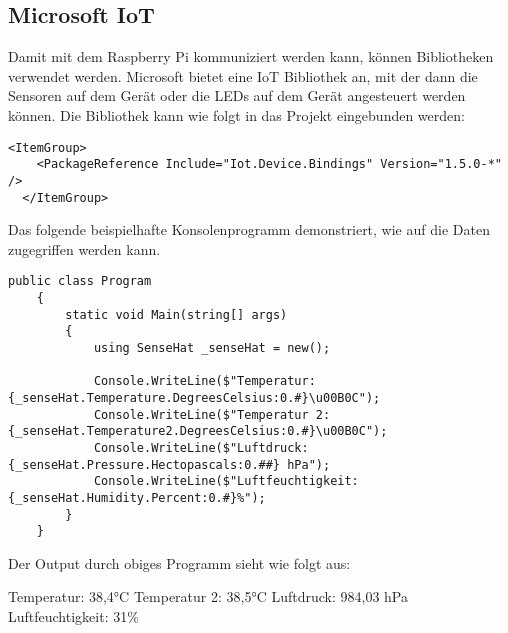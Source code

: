 \subsection{Microsoft IoT}
\label{subsec:MicrosoftIot}
Damit mit dem Raspberry Pi kommuniziert werden kann, können Bibliotheken verwendet werden.
Microsoft bietet eine IoT Bibliothek an, mit der dann die Sensoren auf dem Gerät oder die LEDs auf
dem Gerät angesteuert werden können. Die Bibliothek kann wie folgt in das Projekt eingebunden
werden:

\begin{lstlisting}[language={[Sharp]C}, caption=IoT NuGet Package,
    label=lst:IotNugetPackage]
    <ItemGroup>
    <PackageReference Include="Iot.Device.Bindings" Version="1.5.0-*" />
  </ItemGroup>
\end{lstlisting}

Das folgende beispielhafte Konsolenprogramm demonstriert, wie auf die Daten zugegriffen werden kann.

\begin{lstlisting}[language={[Sharp]C}, caption=SenseHat Beispielprogramm,
    label=lst:SenseHatBeispielProgramm]
    public class Program
    {
        static void Main(string[] args)
        {
            using SenseHat _senseHat = new();

            Console.WriteLine($"Temperatur: {_senseHat.Temperature.DegreesCelsius:0.#}\u00B0C");
            Console.WriteLine($"Temperatur 2: {_senseHat.Temperature2.DegreesCelsius:0.#}\u00B0C");
            Console.WriteLine($"Luftdruck: {_senseHat.Pressure.Hectopascals:0.##} hPa");
            Console.WriteLine($"Luftfeuchtigkeit: {_senseHat.Humidity.Percent:0.#}%");
        }
    }
\end{lstlisting}

Der Output durch obiges Programm sieht wie folgt aus:

\begin{zitat}
    Temperatur: 38,4°C
    \newline
    Temperatur 2: 38,5°C
    \newline
    Luftdruck: 984,03 hPa
    \newline
    Luftfeuchtigkeit: 31\%
\end{zitat}